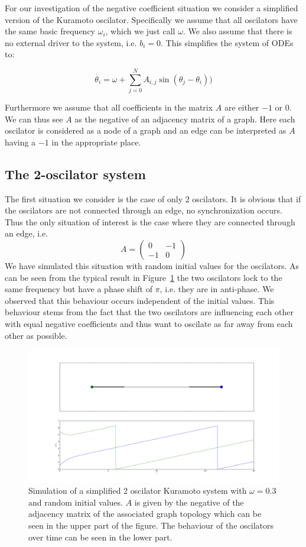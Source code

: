 \label{sec:negative}
For our investigation of the negative coefficient situation we consider a simplified version of the Kuramoto oscilator. Specifically we assume that all oscilators have the same basic frequency $\omega_i$, which we just call $\omega$. We also assume that there is no external driver to the system, i.e. $b_i = 0$. This simplifies the system of ODEs to: 

\[
\dot{\theta_i} = \omega + \sum_{j = 0}^{N}{A_{i, j}\sin({\theta_j - \theta_i})}
)\]

Furthermore we assume that all coefficients in the matrix $A$ are either $-1$ or $0$. We can thus see $A$ as the negative of an adjacency matrix of a graph. Here each oscilator is considered as a node of a graph and an edge can be interpreted as $A$ having a $-1$ in the appropriate place. 

\subsection{The 2-oscilator system}

The first situation we consider is the case of only $2$ oscilators. It is obvious that if the oscilators are not connected through an edge, no synchronization occurs. Thus the only situation of interest is the case where they are connected through an edge, i.e. 
\[
  A = \left( \begin{array}{cc} 0 & -1\\ -1 & 0 \end{array} \right)
\]
We have simulated this situation with random initial values for the oscilators. As can be seen from the typical result in Figure~\ref{fig:negative_2_osc} the two oscilators lock to the same frequency but have a phase shift of $\pi$, i.e. they are in anti-phase. We observed that this behaviour occurs independent of the initial values. This behaviour stems from the fact that the two oscilators are influencing each other with equal negative coefficients and thus want to oscilate as far away from each other as possible. 

\begin{figure}[h]
  \centering
  \includegraphics[width=\textwidth]{imgs/simple_2_osc}
  \caption{Simulation of a simplified 2 oscilator Kuramoto system with $\omega = 0.3$ and random initial values. $A$ is given by the negative of the adjacency matrix of the associated graph topology which can be seen in the upper part of the figure. The behaviour of the oscilators over time can be seen in the lower part. }
  \label{fig:negative_2_osc}
\end{figure}

